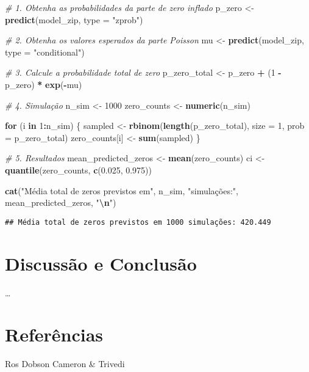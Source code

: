 \documentclass[
]{article}
\newenvironment{Shaded}{\begin{snugshade}}{\end{snugshade}}
\newcommand{\AttributeTok}[1]{\textcolor[rgb]{0.13,0.29,0.53}{#1}}
\newcommand{\CommentTok}[1]{\textcolor[rgb]{0.56,0.35,0.01}{\textit{#1}}}
\newcommand{\ControlFlowTok}[1]{\textcolor[rgb]{0.13,0.29,0.53}{\textbf{#1}}}
\newcommand{\DecValTok}[1]{\textcolor[rgb]{0.00,0.00,0.81}{#1}}
\newcommand{\FloatTok}[1]{\textcolor[rgb]{0.00,0.00,0.81}{#1}}
\newcommand{\FunctionTok}[1]{\textcolor[rgb]{0.13,0.29,0.53}{\textbf{#1}}}
\newcommand{\NormalTok}[1]{#1}
\newcommand{\OtherTok}[1]{\textcolor[rgb]{0.56,0.35,0.01}{#1}}
\newcommand{\SpecialCharTok}[1]{\textcolor[rgb]{0.81,0.36,0.00}{\textbf{#1}}}
\newcommand{\StringTok}[1]{\textcolor[rgb]{0.31,0.60,0.02}{#1}}
\begin{document}
\begin{Shaded}
\begin{Highlighting}[]
\CommentTok{\# 1. Obtenha as probabilidades da parte de zero inflado}
\NormalTok{p\_zero }\OtherTok{\textless{}{-}} \FunctionTok{predict}\NormalTok{(model\_zip, }\AttributeTok{type =} \StringTok{"zprob"}\NormalTok{)         }

\CommentTok{\# 2. Obtenha os valores esperados da parte Poisson}
\NormalTok{mu }\OtherTok{\textless{}{-}} \FunctionTok{predict}\NormalTok{(model\_zip, }\AttributeTok{type =} \StringTok{"conditional"}\NormalTok{)       }

\CommentTok{\# 3. Calcule a probabilidade total de zero}
\NormalTok{p\_zero\_total }\OtherTok{\textless{}{-}}\NormalTok{ p\_zero }\SpecialCharTok{+}\NormalTok{ (}\DecValTok{1} \SpecialCharTok{{-}}\NormalTok{ p\_zero) }\SpecialCharTok{*} \FunctionTok{exp}\NormalTok{(}\SpecialCharTok{{-}}\NormalTok{mu)}

\CommentTok{\# 4. Simulação}
\NormalTok{n\_sim }\OtherTok{\textless{}{-}} \DecValTok{1000}
\NormalTok{zero\_counts }\OtherTok{\textless{}{-}} \FunctionTok{numeric}\NormalTok{(n\_sim)}

\ControlFlowTok{for}\NormalTok{ (i }\ControlFlowTok{in} \DecValTok{1}\SpecialCharTok{:}\NormalTok{n\_sim) \{}
\NormalTok{  sampled }\OtherTok{\textless{}{-}} \FunctionTok{rbinom}\NormalTok{(}\FunctionTok{length}\NormalTok{(p\_zero\_total), }\AttributeTok{size =} \DecValTok{1}\NormalTok{, }\AttributeTok{prob =}\NormalTok{ p\_zero\_total)}
\NormalTok{  zero\_counts[i] }\OtherTok{\textless{}{-}} \FunctionTok{sum}\NormalTok{(sampled)}
\NormalTok{\}}

\CommentTok{\# 5. Resultados}
\NormalTok{mean\_predicted\_zeros }\OtherTok{\textless{}{-}} \FunctionTok{mean}\NormalTok{(zero\_counts)}
\NormalTok{ci }\OtherTok{\textless{}{-}} \FunctionTok{quantile}\NormalTok{(zero\_counts, }\FunctionTok{c}\NormalTok{(}\FloatTok{0.025}\NormalTok{, }\FloatTok{0.975}\NormalTok{))}

\FunctionTok{cat}\NormalTok{(}\StringTok{"Média total de zeros previstos em"}\NormalTok{, n\_sim, }\StringTok{"simulações:"}\NormalTok{, mean\_predicted\_zeros, }\StringTok{"}\SpecialCharTok{\textbackslash{}n}\StringTok{"}\NormalTok{)}
\end{Highlighting}
\end{Shaded}

\begin{verbatim}
## Média total de zeros previstos em 1000 simulações: 420.449
\end{verbatim}

\section{Discussão e Conclusão}\label{discussuxe3o-e-conclusuxe3o}

\ldots{}

\section{Referências}\label{referuxeancias}

Ros Dobson Cameron \& Trivedi
\end{document}
